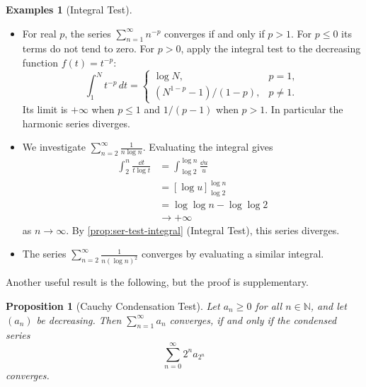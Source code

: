 \documentclass[11pt]{article}
\numberwithin{equation}{section}
\newtheorem{proposition}[theorem]{Proposition}
\theoremstyle{definition}
\newtheorem{examples}[theorem]{Examples}
\theoremstyle{remark}
\newcommand{\pqty}[1]{\left(#1\right)}
\newcommand{\bqty}[1]{\left[#1\right]}
\newcommand{\NN}{\mathbb N}
\newcommand{\plusinfty}{+\infty}
\begin{document}
\begin{examples}[Integral Test]\label{analysis-unit-0050}
    \label{ex:integral-test}%
    \begin{itemize}
        \item For real \(p\), the series \(\sum_{n=1}^{\infty}n^{-p}\) converges
if and only if \(p>1\). For \(p\le0\) its terms do not tend to zero.
For \(p>0\), apply the integral test to the decreasing function \(f(t)=t^{-p}\):
\[
\int_1^N t^{-p}\,dt=
\begin{cases}\log N,&p=1,\\(N^{1-p}-1)/(1-p),&p\ne1.\end{cases}
\]
Its limit is \(+\infty\) when \(p\le1\) and \(1/(p-1)\) when \(p>1\).
In particular the harmonic series diverges.

        \item We investigate \(\sum_{n = 2}^{\infty} \frac{1}{n \log n}\). Evaluating the integral gives
        \begin{align*}
            \int_{2}^{n} \frac{\dd{t}}{t \log t} &= \int_{\log 2}^{\log n} \frac{\dd{u}}{u} \\
            &= \bqty{\log u}_{\log 2}^{\log n} \\
            &= \log \log n - \log \log 2 \\
            &\to \plusinfty
        \end{align*}
        as \(n \to \infty\). By \autoref{prop:ser-test-integral} (Integral Test), this series diverges.

        \item The series \(\sum_{n = 2}^{\infty} \frac{1}{n \pqty{\log n}^2}\) converges by evaluating a similar integral.
    \end{itemize}
\end{examples}

Another useful result is the following, but the proof is supplementary.

\begin{proposition}[Cauchy Condensation Test]\label{analysis-unit-0051}
    \label{prop:ser-test-cauchy-condensation}%
    Let \(a_n \geq 0\) for all \(n \in \NN\), and let \(\pqty{a_n}\) be decreasing. Then \(\sum_{n = 1}^{\infty} a_n\) converges, if and only if the condensed series
    \[
        \sum_{n = 0}^{\infty} 2^n a_{2^n}
    \]
    converges.
\end{proposition}
\end{document}

